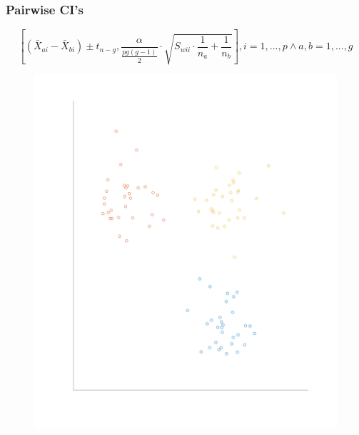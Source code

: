 \documentclass[aspectratio=169,10pt,t]{beamer}
\begin{document}
\begin{frame}[t]
    \frametitle{Pairwise CI's}
    \[
        \left[(\bar{X}_{ai} - \bar{X}_{bi}) \pm t_{n-g}, \frac{\alpha}{ \frac{pg(g-1)}{2}} \cdot \sqrt{S_{wii} \cdot \frac{1}{n_a} + \frac{1}{n_b} } \right] , i = 1,...,p \land a,b = 1,...,g
    \] 
\begin{figure}[H]
    \includegraphics[scale=0.2]{clusters.png}
\end{figure}
\end{frame}
\end{document}
